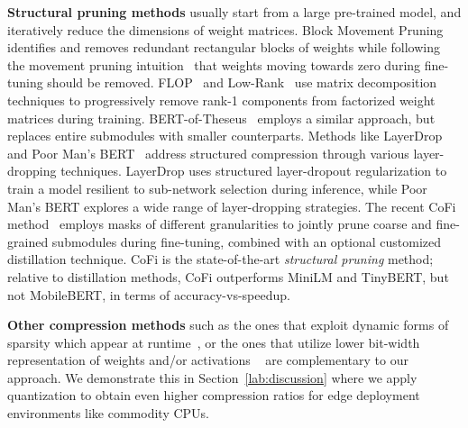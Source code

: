 \documentclass{article}
\theoremstyle{plain}
\theoremstyle{definition}
\theoremstyle{remark}
\renewcommand{\paragraph}[1]{ \noindent \textbf{#1}}
\begin{document}
\paragraph{Structural pruning methods} usually start from a large pre-trained model, and iteratively reduce the dimensions of weight matrices. 
Block Movement Pruning~\citep{lagunas21block} identifies and removes redundant rectangular blocks of weights while following the movement pruning intuition~\citep{Sanh2020MovementPA} that weights moving towards zero during fine-tuning should be removed. 
FLOP~\citep{flop} and Low-Rank~\citep{lowrank} use matrix decomposition techniques to progressively remove rank-1 components from factorized weight matrices during training. BERT-of-Theseus~\citep{bertoftheseus} employs a similar approach, but replaces entire submodules with smaller counterparts. Methods like LayerDrop~\citep{fan2019reducing} and Poor Man's BERT~\citep{poormansbert} address structured compression through various layer-dropping techniques. LayerDrop uses structured layer-dropout regularization to train a model resilient to sub-network selection during inference, while Poor Man's BERT explores a wide range of layer-dropping strategies. The recent CoFi method~\citep{xia2022structured} employs masks of different granularities to jointly prune coarse and fine-grained submodules during fine-tuning, combined with an optional customized distillation technique. 
CoFi is the state-of-the-art \emph{structural pruning} method; relative to distillation methods, CoFi outperforms MiniLM and TinyBERT, but not MobileBERT, in terms of accuracy-vs-speedup.

\paragraph{Other compression methods} such as the ones that exploit dynamic forms of sparsity which appear at runtime~\cite{liu2023deja}, or the ones that utilize lower bit-width representation of weights and/or activations ~\cite{frantar2022gptq, lin2023awq} are complementary to our approach. We demonstrate this in Section~\ref{lab:discussion} where we apply quantization to obtain even higher compression ratios for edge deployment environments like commodity CPUs.
\end{document}
